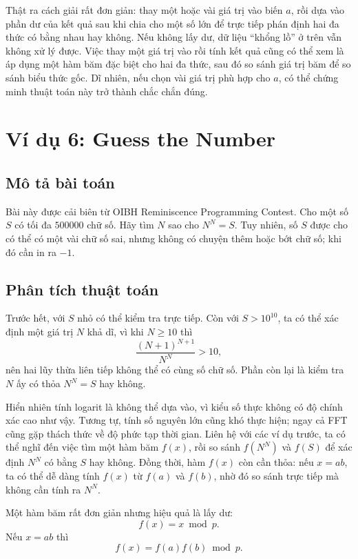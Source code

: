 \documentclass[11pt]{article}
\begin{document}
Thật ra cách giải rất đơn giản: thay một hoặc vài giá trị vào biến $a$, rồi
dựa vào phần dư của kết quả sau khi chia cho một số lớn để trực tiếp phán
định hai đa thức có bằng nhau hay không. Nếu không lấy dư, dữ liệu ``khổng
lồ'' ở trên vẫn không xử lý được. Việc thay một giá trị vào rồi tính kết quả
cũng có thể xem là áp dụng một hàm băm đặc biệt cho hai đa thức, sau đó so
sánh giá trị băm để so sánh biểu thức gốc. Dĩ nhiên, nếu chọn vài giá trị
phù hợp cho $a$, có thể chứng minh thuật toán này trở thành chắc chắn đúng.

\section{Ví dụ 6: Guess the Number}

\subsection{Mô tả bài toán}

Bài này được cải biên từ OIBH Reminiscence Programming Contest. Cho một số
$S$ có tối đa $500000$ chữ số. Hãy tìm $N$ sao cho $N^N=S$. Tuy nhiên, số
$S$ được cho có thể có một vài chữ số sai, nhưng không có chuyện thêm hoặc
bớt chữ số; khi đó cần in ra $-1$.

\subsection{Phân tích thuật toán}

Trước hết, với $S$ nhỏ có thể kiểm tra trực tiếp. Còn với $S>10^{10}$, ta có
thể xác định một giá trị $N$ khả dĩ, vì khi $N\ge 10$ thì
\[
  \frac{(N+1)^{N+1}}{N^N}>10,
\]
nên hai lũy thừa liên tiếp không thể có cùng số chữ số. Phần còn lại là kiểm
tra $N$ ấy có thỏa $N^N=S$ hay không.

Hiển nhiên tính logarit là không thể dựa vào, vì kiểu số thực không có độ
chính xác cao như vậy. Tương tự, tính số nguyên lớn cũng khó thực hiện; ngay
cả FFT cũng gặp thách thức về độ phức tạp thời gian. Liên hệ với các ví dụ
trước, ta có thể nghĩ đến việc tìm một hàm băm $f(x)$, rồi so sánh
$f(N^N)$ và $f(S)$ để xác định $N^N$ có bằng $S$ hay không. Đồng thời, hàm
$f(x)$ còn cần thỏa: nếu $x=ab$, ta có thể dễ dàng tính $f(x)$ từ $f(a)$ và
$f(b)$, nhờ đó so sánh trực tiếp mà không cần tính ra $N^N$.

Một hàm băm rất đơn giản nhưng hiệu quả là lấy dư:
\[
  f(x)=x\bmod p.
\]
Nếu $x=ab$ thì
\[
  f(x)=f(a)f(b)\bmod p.
\]
\end{document}
